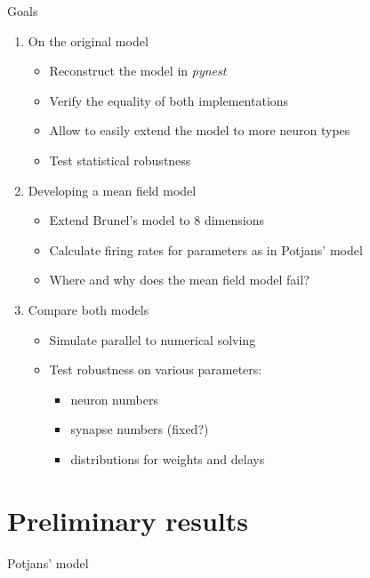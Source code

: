 \documentclass[xcolor=x11names,compress]{beamer}
\renewcommand{\(}{\begin{columns}}
\renewcommand{\)}{\end{columns}}
\newcommand{\<}[1]{\begin{column}{#1}}
\renewcommand{\>}{\end{column}}
\begin{document}
\begin{frame}[t]{Goals}
\begin{enumerate}
    \item On the original model
    \begin{itemize}
        \item Reconstruct the model in \emph{pynest}
        \item Verify the equality of both implementations
        \item Allow to easily extend the model to more neuron types
        \item Test statistical robustness
    \end{itemize}
    \item Developing a mean field model
    \begin{itemize}
        \item Extend Brunel's model to 8 dimensions
        \item Calculate firing rates for parameters as in Potjans' model
        \item Where and why does the mean field model fail?
    \end{itemize}
    \item Compare both models
    \begin{itemize}
        \item Simulate parallel to numerical solving
        \item Test robustness on various parameters:
        \begin{itemize}
            \item neuron numbers
            \item synapse numbers (fixed?)
            \item distributions for weights and delays
        \end{itemize}
    \end{itemize}
\end{enumerate}
\end{frame}


\section{Preliminary results}
\begin{frame}[t]{Potjans' model}
\end{frame}



\end{document}
